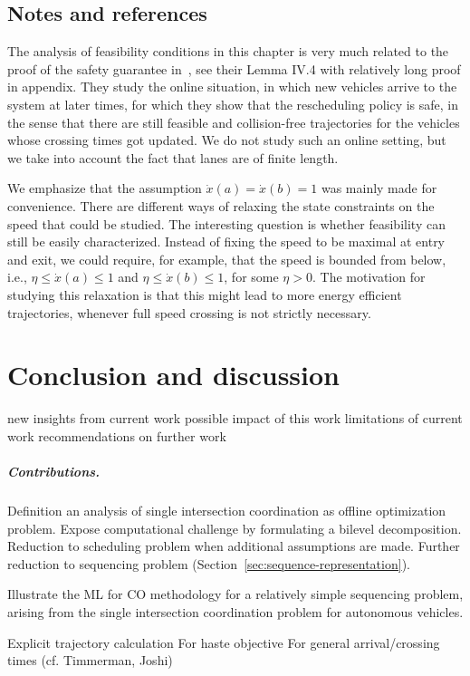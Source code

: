 \documentclass[a4paper]{report}
\theoremstyle{definition}
\theoremstyle{plain}
\begin{document}
\section{Notes and references}

The analysis of feasibility conditions in this chapter is very much related to
the proof of the safety guarantee in~\cite{miculescuPollingsystemsbasedAutonomousVehicle2016}, see their Lemma IV.4 with
relatively long proof in appendix.
%
They study the online situation, in which new vehicles arrive to the system at
later times, for which they show that the rescheduling policy is safe, in the
sense that there are still feasible and collision-free trajectories for the
vehicles whose crossing times got updated.
%
We do not study such an online setting, but we take into account the fact that
lanes are of finite length.

We emphasize that the assumption $\dot{x}(a) = \dot{x}(b) = 1$ was mainly made
for convenience.
%
There are different ways of relaxing the state constraints on the speed that
could be studied.
%
The interesting question is whether feasibility can still be easily characterized.
%
Instead of fixing the speed to be maximal at entry and exit, we could require,
for example, that the speed is bounded from below, i.e., $\eta \leq \dot{x}(a) \leq 1$
and $\eta \leq \dot{x}(b) \leq 1$, for some $\eta > 0$.
%
The motivation for studying this relaxation is that this might lead to more
energy efficient trajectories, whenever full speed crossing is not strictly
necessary.


\chapter{Conclusion and discussion}\label{chap:conclusion}

\begin{outline}
  \1 new insights from current work
  \1 possible impact of this work
  \1 limitations of current work
  \1 recommendations on further work
\end{outline}

\paragraph{Contributions.}
\begin{outline}

  \1 Definition an analysis of single intersection coordination as offline
  optimization problem.
  \2 Expose computational challenge by formulating a bilevel decomposition.
  \2 Reduction to scheduling problem when additional assumptions are made.
  \2 Further reduction to sequencing problem (Section~\ref{sec:sequence-representation}).

  \1 Illustrate the ML for CO methodology for a relatively simple sequencing
  problem, arising from the single intersection coordination problem for
  autonomous vehicles.

  \1 Explicit trajectory calculation
  \2 For haste objective
  \2 For general arrival/crossing times (cf. Timmerman, Joshi)
\end{outline}
\end{document}
